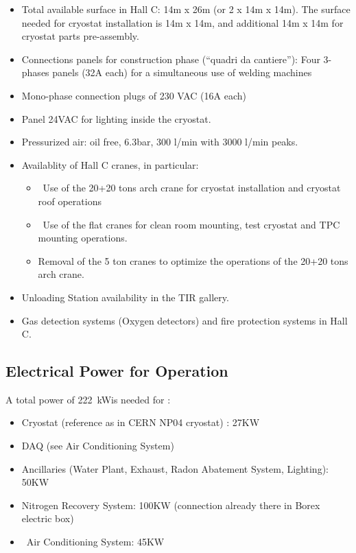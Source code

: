 \begin{itemize}

\item Total available surface in Hall C: 14m x 26m (or 2 x 14m x 14m). The surface needed for cryostat installation is 14m x 14m, and additional 14m x 14m for cryostat parts pre-assembly. 
\item Connections panels for construction phase (“quadri da cantiere”): Four 3-phases panels (32A each) for a simultaneous use of welding machines
\item Mono-phase connection plugs of 230 VAC (16A each)
\item Panel 24VAC for lighting inside the cryostat.
\item Pressurized air: oil free, 6.3bar, 300 l/min with 3000 l/min peaks.
\item Availablity of Hall C cranes, in particular:
\begin{itemize}[label=-]
\item Use of the 20+20 tons arch crane for cryostat installation and cryostat roof operations
\item Use of the flat cranes for clean room mounting, test cryostat and TPC mounting operations.
\item Removal of the 5 ton cranes to optimize the operations of the 20+20 tons arch crane.
\end{itemize}
\item Unloading Station availability in the TIR gallery.
\item Gas detection systems (Oxygen detectors) and fire protection systems in Hall C.

\end{itemize}

\subsection{Electrical Power for \DSks Operation}
\label{sec:ElectricalPower}

\newcommand{\TotalPowerConsumption}{\SI{222}{\kW}}
\newcommand{\TotalUPSPowerConsumption}{\SI{85}{\kW}}

A total power of \TotalPowerConsumption  is needed for \DSks:

\begin{itemize}
\item Cryostat (reference as in CERN NP04 cryostat) : 27KW 
\item	DAQ (see Air Conditioning System) 
\item	Ancillaries (Water Plant, Exhaust, Radon Abatement System, Lighting): 50KW 
\item Nitrogen Recovery System: 100KW (connection already there in Borex electric box)
\item Air Conditioning System: 45KW 
\end{itemize}
\vspace{\baselineskip}

